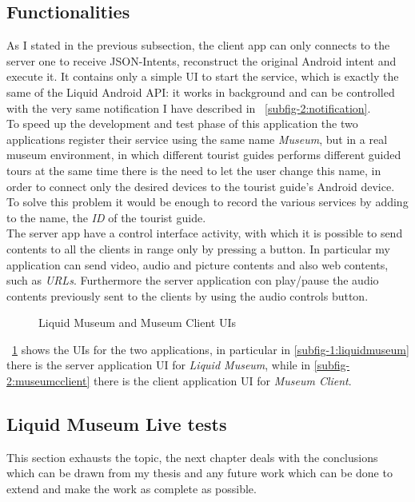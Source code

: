\subsection{Functionalities}
As I stated in the previous subsection, the client app can only connects to the server one to receive JSON-Intents, reconstruct the original Android intent and execute it. It contains only a simple UI to start the service, which is exactly the same of the Liquid Android API: it works in background and can be controlled with the very same notification I have described in \figurename~\ref{subfig-2:notification}. \\
To speed up the development and test phase of this application the two applications register their service using the same name \textit{Museum}, but in a real museum environment, in which different tourist guides performs different guided tours at the same time there is the need to let the user change this name, in order to connect only the desired devices to the tourist guide's Android device. To solve this problem it would be enough to record the various services by adding to the name, the \textit{ID} of the tourist guide.\\
The server app have a control interface activity, with which it is possible to send contents to all the clients in range only by pressing a button. In particular my application can send video, audio and picture contents and also web contents, such as \textit{URLs}. Furthermore the server application con play/pause the audio contents previously sent to the clients by using the audio controls button.\\
\begin{figure}[h]
	\centering
	\begin{minipage}{.49\textwidth}\centering
	\end{minipage}
	\begin{minipage}{.49\textwidth}\centering
	\end{minipage}
	\caption{Liquid Museum and Museum Client UIs}
	\label{fig:5.11}
\end{figure}
\figurename~\ref{fig:5.11} shows the UIs for the two applications, in particular in \ref{subfig-1:liquidmuseum} there is the server application UI for \textit{Liquid Museum}, while in \ref{subfig-2:museumcclient} there is the client application UI for \textit{Museum Client}.
\subsection{Liquid Museum Live tests}

\bigskip
\par This section exhausts the topic, the next chapter deals with the conclusions which can be drawn from my thesis and any future work which can be done to extend and make the work as complete as possible.